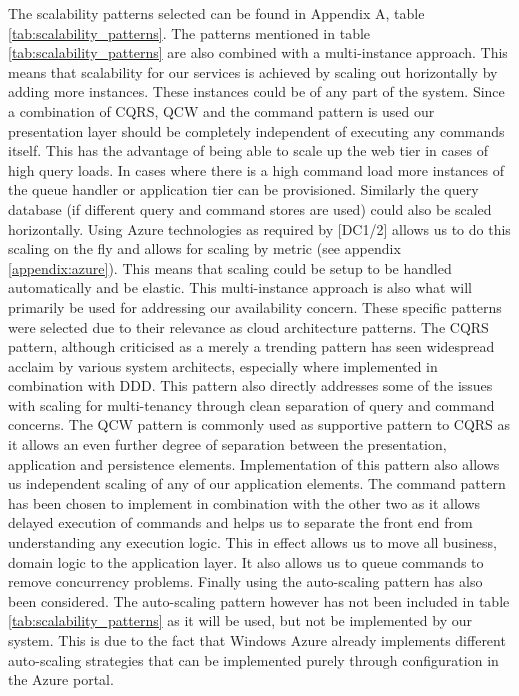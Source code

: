 The scalability patterns selected can be found in Appendix A, table \ref{tab:scalability_patterns}.
The patterns mentioned in table \ref{tab:scalability_patterns} are also combined with a multi-instance approach. This means that scalability for our services is achieved by scaling out horizontally by adding more instances. These instances could be of any part of the system. Since a combination of CQRS, QCW and the command pattern is used our presentation layer should be completely independent of executing any commands itself. This has the advantage of being able to scale up the web tier in cases of high query loads. In cases where there is a high command load more instances of the queue handler or application tier can be provisioned. Similarly the query database (if different query and command stores are used) could also be scaled horizontally. Using Azure technologies as required by [DC1/2] allows us to do this scaling on the fly and allows for scaling by metric (see appendix \ref{appendix:azure}). This means that scaling could be setup to be handled automatically and be elastic. This multi-instance approach is also what will primarily be used for addressing our availability concern. These specific patterns were selected due to their relevance as cloud architecture patterns. The CQRS pattern, although criticised as a merely a trending pattern has seen widespread acclaim by various system architects, especially where implemented in combination with DDD. This pattern also directly addresses some of the issues with scaling for multi-tenancy through clean separation of query and command concerns. The QCW pattern is commonly used as supportive pattern to CQRS as it allows an even further degree of separation between the presentation, application and persistence elements. Implementation of this pattern also allows us independent scaling of any of our application elements. The command pattern has been chosen to implement in combination with the other two as it allows delayed execution of commands and helps us to separate the front end from understanding any execution logic. This in effect allows us to move all business, domain logic to the application layer. It also allows us to queue commands to remove concurrency problems. Finally using the auto-scaling pattern has also been considered. The auto-scaling pattern however has not been included in table \ref{tab:scalability_patterns} as it will be used, but not be implemented by our system. This is due to the fact that Windows Azure already implements different auto-scaling strategies that can be implemented purely through configuration in the Azure portal.  



